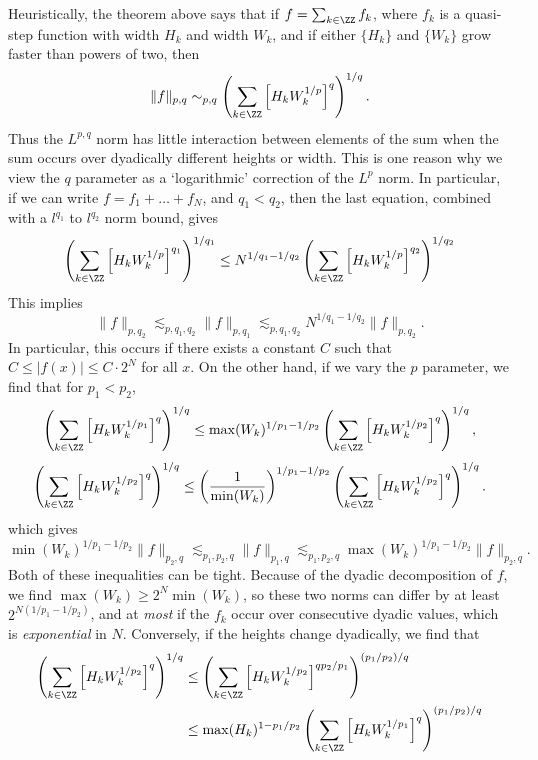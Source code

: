 \begin{remark}
    Heuristically, the theorem above says that if $f = \sum_{k \in \ZZ} f_k$, where $f_k$ is a quasi-step function with width $H_k$ and width $W_k$, and if either $\{ H_k \}$ and $\{ W_k \}$ grow faster than powers of two, then
    \[ \| f \|_{p,q} \sim_{p,q} \left( \sum_{k \in \ZZ} \left[ H_k W_k^{1/p} \right]^q \right)^{1/q}. \]
    Thus the $L^{p,q}$ norm has little interaction between elements of the sum when the sum occurs over dyadically different heights or width. This is one reason why we view the $q$ parameter as a `logarithmic' correction of the $L^p$ norm. In particular, if we can write $f = f_1 + \dots + f_N$, and $q_1 < q_2$, then the last equation, combined with a $l^{q_1}$ to $l^{q_2}$ norm bound, gives
    \[ \left( \sum_{k \in \ZZ} \left[ H_k W_k^{1/p} \right]^{q_1} \right)^{1/q_1} \leq N^{1/q_1 - 1/q_2} \left( \sum_{k \in \ZZ} \left[ H_k W_k^{1/p} \right]^{q_2} \right)^{1/q_2} \]
    This implies
    \[ \| f \|_{p,q_2} \lesssim_{p,q_1,q_2} \| f \|_{p,q_1} \lesssim_{p,q_1,q_2} N^{1/q_1 - 1/q_2} \| f \|_{p,q_2}. \]
    In particular, this occurs if there exists a constant $C$ such that $C \leq |f(x)| \leq C \cdot 2^N$ for all $x$. On the other hand, if we vary the $p$ parameter, we find that for $p_1 < p_2$,
    \[ \left( \sum_{k \in \ZZ} \left[ H_k W_k^{1/p_1} \right]^q \right)^{1/q} \leq \max(W_k)^{1/p_1 - 1/p_2} \left( \sum_{k \in \ZZ} \left[H_k W_k^{1/p_2} \right]^q \right)^{1/q}, \]
    \[ \left( \sum_{k \in \ZZ} \left[ H_k W_k^{1/p_2} \right]^q \right)^{1/q} \leq \left( \frac{1}{\min(W_k)} \right)^{1/p_1 - 1/p_2} \left( \sum_{k \in \ZZ} \left[ H_k W_k^{1/p_2} \right]^q \right)^{1/q}. \]
    which gives
    \[ \min(W_k)^{1/p_1 - 1/p_2} \| f \|_{p_2,q} \lesssim_{p_1,p_2,q} \| f \|_{p_1,q} \lesssim_{p_1,p_2,q} \max(W_k)^{1/p_1 - 1/p_2} \| f \|_{p_2,q}. \]
    Both of these inequalities can be tight. Because of the dyadic decomposition of $f$, we find $\max(W_k) \geq 2^N \min(W_k)$, so these two norms can differ by at least $2^{N(1/p_1 - 1/p_2)}$, and at \emph{most} if the $f_k$ occur over consecutive dyadic values, which is \emph{exponential} in $N$. Conversely, if the heights change dyadically, we find that
    \begin{align*}
        \left( \sum_{k \in \ZZ} \left[ H_k W_k^{1/p_2} \right]^q \right)^{1/q} &\leq \left( \sum_{k \in \ZZ} \left[ H_k W_k^{1/p_2} \right]^{qp_2/p_1} \right)^{(p_1/p_2)/q}\\
        &\leq \max(H_k)^{1 - p_1/p_2} \left( \sum_{k \in \ZZ} \left[ H_k W_k^{1/p_1} \right]^q \right)^{(p_1/p_2)/q}

\end{align*}
\end{remark}
